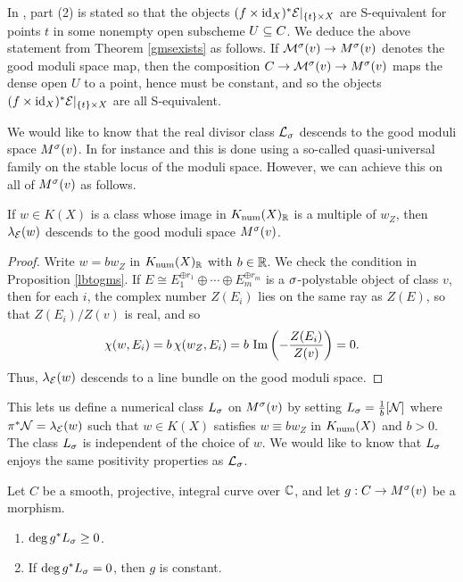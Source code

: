 In \cite{BM}, part (2) is stated so that the objects $(f \times \mathrm{id}_X)^*\mathcal{E}|_{\{t\} \times X}$ are S-equivalent for points $t$ in some nonempty open subscheme $U \subseteq C$. We deduce the above statement from Theorem \ref{gmsexists} as follows. If $\mathcal{M}^\sigma(v) \to M^\sigma(v)$ denotes the good moduli space map, then the composition $C \to \mathcal{M}^\sigma(v) \to M^\sigma(v)$ maps the dense open $U$ to a point, hence must be constant, and so the objects $(f\times \mathrm{id}_X)^*\mathcal{E}|_{\{t\} \times X}$ are all S-equivalent. 

We would like to know that the real divisor class $\mathcal{L}_\sigma$ descends to the good moduli space $M^\sigma(v)$. In for instance \cite{BM} and \cite{nuer} this is done using a so-called quasi-universal family on the stable locus of the moduli space. However, we can achieve this on all of $M^\sigma(v)$ as follows.
\begin{lem}\label{nefdescendtogms}
    If $w \in K(X)$ is a class whose image in $K_{\mathrm{num}}(X)_{\mathbb{R}}$ is a multiple of $w_Z$, then $\lambda_{\mathcal{E}}(w)$ descends to the good moduli space $M^\sigma(v)$.
\end{lem} 
\begin{proof}
    Write $w = b w_Z$ in $K_{\mathrm{num}}(X)_{\mathbb{R}}$ with $b \in \mathbb{R}$. We check the condition in Proposition \ref{lbtogms}. If $E \cong E_1^{\oplus r_1} \oplus \cdots \oplus E_m^{\oplus r_m}$ is a $\sigma$-polystable object of class $v$, then for each $i$, the complex number $Z(E_i)$ lies on the same ray as $Z(E)$, so that $Z(E_i)/Z(v)$ is real, and so
    \[ \chi(w, E_i) = b\,\chi(w_Z, E_i) = b\,\operatorname{\mathrm{Im}}\left(-\frac{Z(E_i)}{Z(v)}\right) = 0. \]
    Thus, $\lambda_{\mathcal{E}}(w)$ descends to a line bundle on the good moduli space.    
\end{proof}
This lets us define a numerical class $L_\sigma$ on $M^\sigma(v)$ by setting $L_\sigma = \frac{1}{b}[\mathcal{N}]$ where $\pi^*\mathcal{N} = \lambda_{\mathcal{E}}(w)$ such that $w \in K(X)$ satisfies $w \equiv b w_Z$ in $K_{\mathrm{num}}(X)$ and $b > 0$. The class $L_\sigma$ is independent of the choice of $w$. We would like to know that $L_\sigma$ enjoys the same positivity properties as $\mathcal{L}_\sigma$.
\begin{lem}\label{gmsnef}
    Let $C$ be a smooth, projective, integral curve over $\mathbb{C}$, and let $g: C \to M^\sigma(v)$ be a morphism.
    \begin{enumerate}[(1')]
        \item $\deg g^* L_\sigma \ge 0$.
        \item If $\deg g^* L_\sigma = 0$, then $g$ is constant.
    \end{enumerate}
\end{lem}
